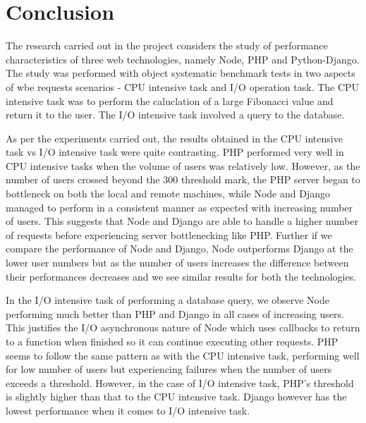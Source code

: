 \documentclass[../thesis.tex]{subfiles}
\begin{document}
\section{Conclusion}
The research carried out in the project considers the study of performance characteristics of three web technologies, namely Node, PHP and Python-Django. The study was performed with object systematic benchmark tests in two aspects of wbe requests scenarios - CPU intensive task and I/O operation task. The CPU intensive task was to perform the caluclation of a large Fibonacci value and return it to the user. The I/O intensive task involved a query to the database.
\newline

As per the experiments carried out, the results obtained in the CPU intensive task vs I/O intensive task were quite contrasting. PHP performed very well in CPU intensive tasks when the volume of users was relatively low. However, as the number of users crossed beyond the 300 threshold mark, the PHP server began to bottleneck on both the local and remote machines, while Node and Django managed to perform in a consistent manner as expected with increasing number of users. This suggests that Node and Django are able to handle a higher number of requests before experiencing server bottlenecking like PHP. Further if we compare the performance of Node and Django, Node outperforms Django at the lower user numbers but as the number of users increases the difference between their performances decreases and we see similar results for both the technologies. 
\newline

In the I/O intensive task of performing a database query, we observe Node performing much better than PHP and Django in all cases of increasing users. This justifies the I/O asynchronous nature of Node which uses callbacks to return to a function when finished so it can continue executing other requests. PHP seems to follow the same pattern as with the CPU intensive task, performing well for low number of users but experiencing failures when the number of users exceeds a threshold. However, in the case of I/O intensive task, PHP's threshold is slightly higher than that to the CPU intensive task. Django however has the lowest performance when it comes to I/O intensive task.
\newline
\end{document}
